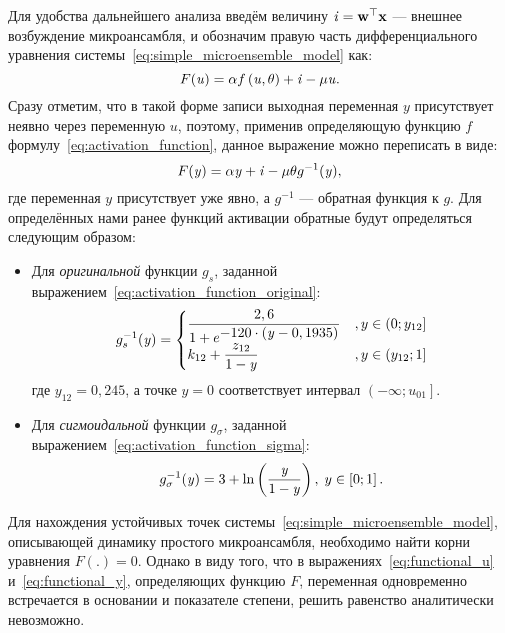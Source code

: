 Для удобства дальнейшего анализа введём величину $\mathit{i} = \mathrm{\mathbf{w}}^{\top} \mathrm{\mathbf{x}}$ --- внешнее возбуждение микроансамбля, и обозначим правую часть дифференциального уравнения системы~\eqref{eq:simple_microensemble_model} как:
\begin{equation}
    \label{eq:functional_u}
    F(\mathit{u}) = \alpha f\left( \mathit{u}, \theta \right) + \mathit{i} - \mu \mathit{u}.
\end{equation}
Сразу отметим, что в такой форме записи выходная переменная $y$ присутствует неявно через переменную $u$, поэтому, применив определяющую функцию $f$ формулу~\eqref{eq:activation_function}, данное выражение можно переписать в виде:
\begin{equation}
    \label{eq:functional_y}
    F(\mathit{y}) = \alpha \mathit{y} + \mathit{i} - \mu \theta g^{-1}(\mathit{y}),
\end{equation}
где переменная $y$ присутствует уже явно, а $g^{-1}$ --- обратная функция к $g$. Для определённых нами ранее функций активации обратные будут определяться следующим образом:
\begin{itemize}
    \item Для \textit{оригинальной} функции $g_{s}$, заданной выражением~\eqref{eq:activation_function_original}:
    \begin{equation}
        \label{eq:unactivation_function_original}
        g_{s}^{-1}(\mathit{y}) = 
        \begin{cases}
            \dfrac{2,6}{1 + e^{\displaystyle -120 \cdot (\mathit{y} - 0,1935)}} &, y \in \left(0; y_{12}\right] \\
            k_{12} + \dfrac{z_{12}}{1 - \mathit{y}}                             &, y \in \left(y_{12}; 1\right] \\
        \end{cases}
    \end{equation}
    где $y_{12} = 0,245$, а точке $y = 0$ соответствует интервал $\left(-\infty; u_{01}\right]$.
    \item Для \textit{сигмоидальной} функции $g_{\sigma}$, заданной выражением~\eqref{eq:activation_function_sigma}:
    \begin{equation}
        \label{eq:unactivation_function_sigma}
        g_{\sigma}^{-1}(\mathit{y}) = 3 + \ln\left(\dfrac{\mathit{y}}{1 - \mathit{y}}\right),\;y \in \left[0; 1\right].
    \end{equation}
\end{itemize}

Для нахождения устойчивых точек системы~\eqref{eq:simple_microensemble_model}, описывающей динамику простого микроансамбля, необходимо найти корни уравнения $F(.) = 0$. Однако в виду того, что в  выражениях~\eqref{eq:functional_u} и~\eqref{eq:functional_y}, определяющих функцию  $F$, переменная одновременно встречается в основании и показателе степени, решить равенство аналитически невозможно. 

